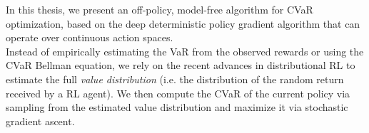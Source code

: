 In this thesis, we present an off-policy, model-free algorithm for CVaR optimization,
based on the deep deterministic policy gradient algorithm that can operate over continuous action spaces.\\
Instead of empirically estimating the VaR from the observed rewards or using the CVaR
Bellman equation, we rely on the recent advances in distributional RL 
\citep{Bellemare2017,Dabney2018a,Dabney2018b} to estimate the full
\textit{value distribution} (i.e. the distribution of the random return received by a RL agent).
We then compute the CVaR of the current policy via sampling from the estimated value distribution
and maximize it via stochastic gradient ascent.








